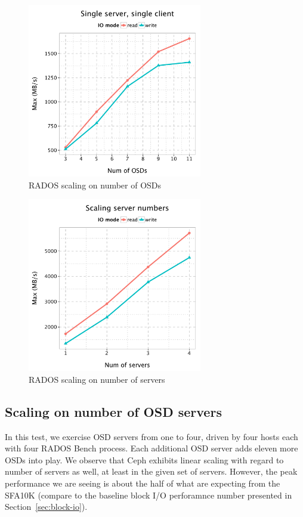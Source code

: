 \begin{figure}[!t]
\centering
\includegraphics[width=3in]{data/rados_osd}
\caption{RADOS scaling on number of OSDs}
\label{fig:osd-scale}
\end{figure}

\begin{figure}[!t]
\centering
\includegraphics[width=3in]{data/rados_server}
\caption{RADOS scaling on number of servers}
\label{fig:oss-scale}
\end{figure}

\subsection{Scaling on number of OSD servers}

In this test, we exercise OSD servers from one to four, driven by four hosts
each with four RADOS Bench process. Each additional OSD server
adds eleven more OSDs into play. We observe that Ceph exhibits linear scaling with
regard to number of servers as well, at least in the given set of servers.
However, the peak performance we are seeing is about the half of what are
expecting from the SFA10K (compare to the baseline block I/O perforamnce number
presented in Section~\ref{sec:block-io}).

